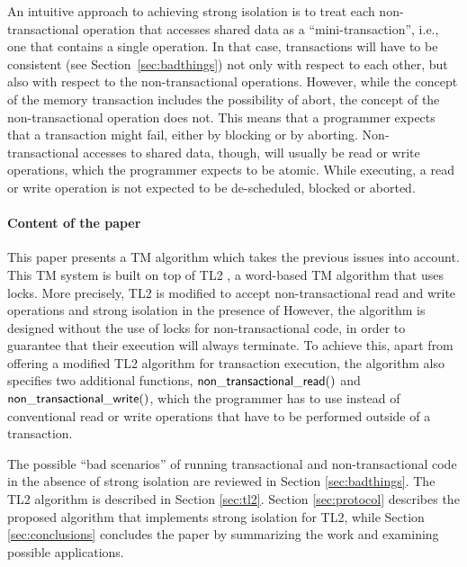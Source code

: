 \documentclass[11pt,letterpaper]{article}
\begin{document}
An  intuitive approach  to  achieving  strong isolation  is  to treat  each
non-transactional operation that 
accesses shared data  as a ``mini-transaction'', i.e., one  that contains a
single operation. In that case,  transactions  will have to  be  
consistent (see Section~\ref{sec:badthings})  not only with 
respect to each other, but 
also with respect to the  non-transactional operations. However, while the
concept of the memory  transaction includes the possibility of abort,
the concept of the non-transactional operation does not.  This means that a
programmer expects  that a transaction  
might fail,  either by blocking or by  aborting. Non-transactional accesses
to shared data, though,  
will usually be  read or write operations, which  the programmer expects to
be  atomic. While executing, a  read  or write  operation   is  not 
expected  to  be de-scheduled, blocked or aborted.  



\paragraph{Content of the paper}
This paper presents  a TM  algorithm which takes the
previous issues into account. This TM system is built on top of 
TL2 \cite{dice06},  a  word-based  TM algorithm  that  uses locks. 
More precisely,  TL2 is modified to accept non-transactional read 
and write operations and strong isolation in the presence of  However,  
the algorithm  is designed  without the use  of locks  for non-transactional
code, in order to guarantee that their execution will always terminate.  
To achieve  this,  apart from  offering  a modified  TL2
algorithm for transaction execution,  
the     algorithm    also     specifies     two    additional     functions,
${\sf non\_transactional\_read()}$ and ${\sf non\_transactional\_write()}$,  
which  the programmer  has to  use instead  of conventional  read  or write
operations that have to be performed  outside  of  a  transaction.  

The  possible ``bad  scenarios''  of  running
transactional and non-transactional code in  
the absence of strong isolation are reviewed in Section 
\ref{sec:badthings}. The TL2 algorithm is described in Section \ref{sec:tl2}. 
Section \ref{sec:protocol} describes  the proposed algorithm that implements
strong isolation for TL2, while  
Section \ref{sec:conclusions}  concludes the paper by  summarizing the work
and examining possible applications.  
\end{document}
